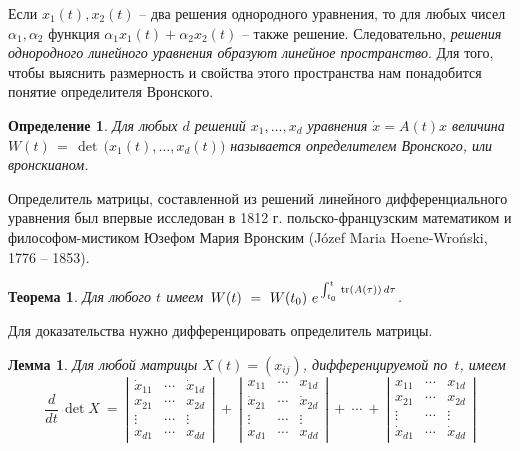 \documentclass[12pt,a4paper]{article}
\newtheorem{theorem}{Теорема}
\newtheorem{lemma}{Лемма}
\newtheorem{defi}{Определение}
\begin{document}
Если $x_1(t), x_2(t)$ -- два решения однородного уравнения, то для любых чисел $\alpha_1, \alpha_2$
функция $\alpha_1 x_1 (t) + \alpha_2 x_2 (t)$ -- также решение. Следовательно,
{\em решения однородного линейного уравнения образуют линейное пространство}.
Для того, чтобы выяснить размерность и свойства этого пространства нам понадобится
понятие определителя Вронского.
\begin{defi}\label{d.wron}
Для любых $d$ решений $x_1, \ldots, x_d$ уравнения $\dot x = A(t) x$
величина  \linebreak $W(t) \, = \, \det \, \bigl(x_1(t), \ldots , x_d(t)\bigr)$ называется
определителем Вронского, или вронскианом.
\end{defi}
Определитель матрицы, составленной из решений линейного дифференциального уравнения
был впервые исследован в 1812 г.
польско-французским математиком и философом-мистиком Юзефом Мария Вронским (J\'ozef Maria Hoene-Wro\'nski, 1776 -- 1853).
\begin{theorem}\label{th.w}
Для любого $t$ имеем $\, W(t) \ = \ W(t_0) \ e^{\, \int_{t_0}^t \, {\rm tr}(A(\tau))\, d \tau}$.
\end{theorem}
Для доказательства нужно дифференцировать определитель матрицы.
\begin{lemma}\label{l.ddet}
Для любой матрицы $X(t) = (x_{ij})$, дифференцируемой по~$t$,  имеем
\begin{equation}\label{eq.ddet}
\frac{d}{dt}\, \det X \ = \
\left|
\begin{array}{ccc}
\dot x_{11} & \cdots & \dot x_{1d}\\
 x_{21} & \cdots &  x_{2d}\\
\vdots  &    \cdots & \vdots \\
 x_{d1} & \cdots &  x_{dd}
\end{array}
\right| \ + \
\left|
\begin{array}{ccc}
x_{11} & \cdots & x_{1d}\\
\dot x_{21} & \cdots &  \dot x_{2d}\\
\vdots  &    \cdots & \vdots \\
 x_{d1} & \cdots &  x_{dd}
\end{array}
\right|
 \ + \ \cdots \ + \
\left|
\begin{array}{ccc}
x_{11} & \cdots & x_{1d}\\
x_{21} & \cdots &  x_{2d}\\
\vdots  &    \cdots & \vdots \\
\dot x_{d1} & \cdots &  \dot x_{dd}
\end{array}
\right|
\end{equation}
\end{lemma}
\end{document}
